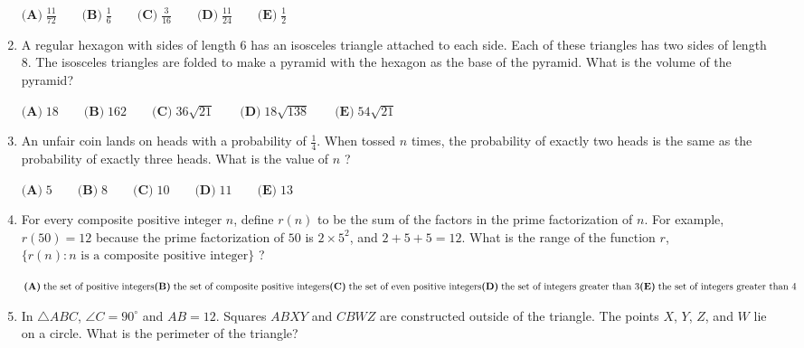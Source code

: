 \documentclass{article}
\begin{document}
\begin{enumerate}[label=\arabic*., itemsep=0.5em]
\(\textbf{(A)}\; \frac{11}{72} \qquad\textbf{(B)}\; \frac{1}{6} \qquad\textbf{(C)}\; \frac{3}{16} \qquad\textbf{(D)}\; \frac{11}{24} \qquad\textbf{(E)}\; \frac{1}{2}\)\par \vspace{0.5em}\item A regular hexagon with sides of length 6 has an isosceles triangle attached to each side. Each of these triangles has two sides of length 8. The isosceles triangles are folded to make a pyramid with the hexagon as the base of the pyramid. What is the volume of the pyramid?

\(\textbf{(A)}\; 18 \qquad\textbf{(B)}\; 162 \qquad\textbf{(C)}\; 36\sqrt{21} \qquad\textbf{(D)}\; 18\sqrt{138} \qquad\textbf{(E)}\; 54\sqrt{21}\)\par \vspace{0.5em}\item An unfair coin lands on heads with a probability of \(\tfrac{1}{4}\). When tossed \(n\) times, the probability of exactly two heads is the same as the probability of exactly three heads. What is the value of \(n\) ?

\(\textbf{(A)}\; 5 \qquad\textbf{(B)}\; 8 \qquad\textbf{(C)}\; 10 \qquad\textbf{(D)}\; 11 \qquad\textbf{(E)}\; 13\)\par \vspace{0.5em}\item For every composite positive integer \(n\), define \(r(n)\) to be the sum of the factors in the prime factorization of \(n\). For example, \(r(50) = 12\) because the prime factorization of \(50\) is \(2 \times 5^{2}\), and \(2 + 5 + 5 = 12\). What is the range of the function \(r\), \(\{r(n): n \text{ is a composite positive integer}\}\) ?

\(\textbf{(A)}\; \text{the set of positive integers} \\
\textbf{(B)}\; \text{the set of composite positive integers} \\
\textbf{(C)}\; \text{the set of even positive integers} \\
\textbf{(D)}\; \text{the set of integers greater than 3} \\
\textbf{(E)}\; \text{the set of integers greater than 4}\)\par \vspace{0.5em}\item In \(\triangle ABC\), \(\angle C = 90^\circ\) and \(AB = 12\). Squares \(ABXY\) and \(CBWZ\) are constructed outside of the triangle. The points \(X\), \(Y\), \(Z\), and \(W\) lie on a circle. What is the perimeter of the triangle?


\end{enumerate}
\end{document}
